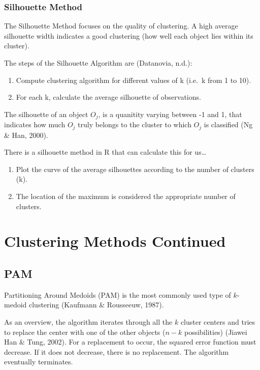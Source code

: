 \documentclass[12pt,twoside]{amherstthesis}
\providecommand{\tightlist}{%
  \setlength{\itemsep}{0pt}\setlength{\parskip}{0pt}}
\begin{document}
  \subsection{Silhouette Method}\label{silhouette-method}
  
  The Silhouette Method focuses on the quality of clustering. A high
  average silhouette width indicates a good clustering (how well each
  object lies within its cluster).
  
  The steps of the Silhouette Algorithm are (Datanovia, n.d.):
  
  \begin{enumerate}
  \def\labelenumi{\arabic{enumi}.}
  \tightlist
  \item
    Compute clustering algorithm for different values of k (i.e.~k from 1
    to 10).
  \item
    For each k, calculate the average silhouette of observations.
  \end{enumerate}
  
  The silhouette of an object \(O_j\), is a quanitity varying between -1
  and 1, that indicates how much \(O_j\) truly belongs to the cluster to
  which \(O_j\) is classified (Ng \& Han, 2000).
  
  There is a silhouette method in R that can calculate this for us\ldots{}
  
  \begin{enumerate}
  \def\labelenumi{\arabic{enumi}.}
  \setcounter{enumi}{2}
  \tightlist
  \item
    Plot the curve of the average silhouettes according to the number of
    clusters (k).
  \item
    The location of the maximum is considered the appropriate number of
    clusters.
  \end{enumerate}
  
  \chapter{Clustering Methods Continued}\label{typeset-equ}
  
  \section{PAM}\label{pam}
  
  Partitioning Around Medoids (PAM) is the most commonly used type of
  \(k\)-medoid clustering (Kaufmann \& Rousseeuw, 1987).
  
  As an overview, the algorithm iterates through all the \(k\) cluster
  centers and tries to replace the center with one of the other objects
  (\(n-k\) possibilities) (Jiawei Han \& Tung, 2002). For a replacement to
  occur, the squared error function must decrease. If it does not
  decrease, there is no replacement. The algorithm eventually terminates.
  
\end{document}
